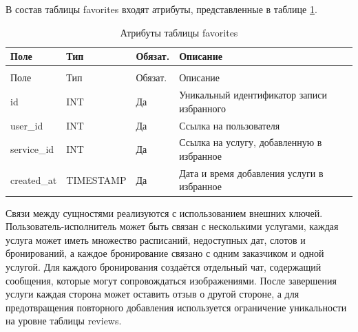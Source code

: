 В состав таблицы favorites входят атрибуты, представленные в таблице \ref{favorites:table}.

\begin{longtable}{|>{\raggedright\arraybackslash}p{3.8cm}|>{\raggedright\arraybackslash}p{3.8cm}|>{\centering\arraybackslash}p{2.0cm}|>{\raggedright\arraybackslash}p{5.4cm}|}
	\caption{Атрибуты таблицы favorites}\label{favorites:table} \\ \hline
	\centering Поле & \centering Тип & \centering Обязат. & \centering\arraybackslash Описание \\ \hline
	\endfirsthead
	\multicolumn{4}{l}{Продолжение таблицы \ref{favorites:table}} \\ \hline
	\centering Поле & \centering Тип & \centering Обязат. & \centering\arraybackslash Описание \\ \hline
	\endhead
	id & INT & Да & Уникальный идентификатор записи избранного \\ \hline
	user\_id & INT & Да & Ссылка на пользователя \\ \hline
	service\_id & INT & Да & Ссылка на услугу, добавленную в избранное \\ \hline
	created\_at & TIMESTAMP & Да & Дата и время добавления услуги в избранное \\ \hline
\end{longtable}

Связи между сущностями реализуются с использованием внешних ключей. Пользователь-исполнитель может быть связан с несколькими услугами, каждая услуга может иметь множество расписаний, недоступных дат, слотов и бронирований, а каждое бронирование связано с одним заказчиком и одной услугой. Для каждого бронирования создаётся отдельный чат, содержащий сообщения, которые могут сопровождаться изображениями. После завершения услуги каждая сторона может оставить отзыв о другой стороне, а для предотвращения повторного добавления используется ограничение уникальности на уровне таблицы reviews.